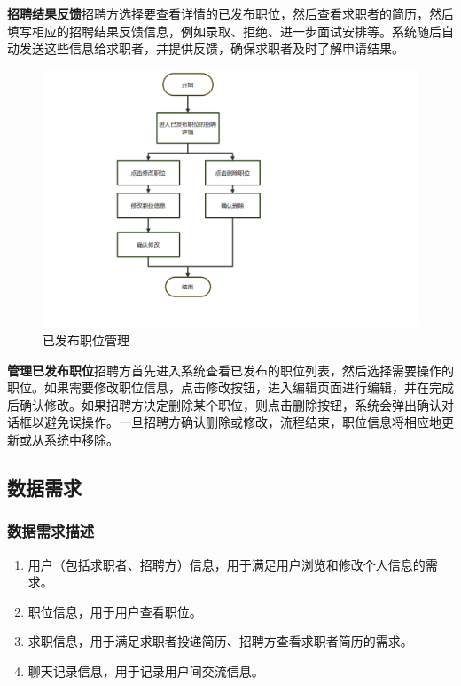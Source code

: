 \documentclass[UTF8,a4paper,10pt]{ctexart}
\begin{document}
\textbf{招聘结果反馈}\space 招聘方选择要查看详情的已发布职位，然后查看求职者的简历，然后填写相应的招聘结果反馈信息，例如录取、拒绝、进一步面试安排等。系统随后自动发送这些信息给求职者，并提供反馈，确保求职者及时了解申请结果。

\begin{figure}[H]
    \centering
    \includegraphics[width=\textwidth]{img/已发布职位管理.png}
    \caption{已发布职位管理}
    \label{fig:已发布职位管理}
\end{figure}

\textbf{管理已发布职位}\space 招聘方首先进入系统查看已发布的职位列表，然后选择需要操作的职位。如果需要修改职位信息，点击修改按钮，进入编辑页面进行编辑，并在完成后确认修改。如果招聘方决定删除某个职位，则点击删除按钮，系统会弹出确认对话框以避免误操作。一旦招聘方确认删除或修改，流程结束，职位信息将相应地更新或从系统中移除。

\subsection{数据需求}

\subsubsection{数据需求描述}

\begin{enumerate}
    \item 用户（包括求职者、招聘方）信息，用于满足用户浏览和修改个人信息的需求。
    \item 职位信息，用于用户查看职位。
    \item 求职信息，用于满足求职者投递简历、招聘方查看求职者简历的需求。
    \item 聊天记录信息，用于记录用户间交流信息。
\end{enumerate}
\end{document}
